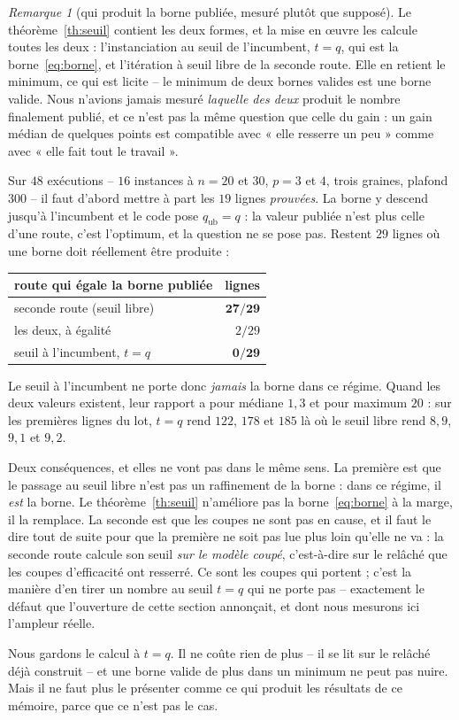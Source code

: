 \documentclass[11pt,a4paper]{article}
\theoremstyle{plain}
\theoremstyle{remark}
\newtheorem{remark}{Remarque}
\begin{document}
\begin{remark}[qui produit la borne publiée, mesuré plutôt que supposé]
\label{rem:routeporteuse}
Le théorème~\ref{th:seuil} contient les deux formes, et la mise en {\oe}uvre
les calcule toutes les deux : l'instanciation au seuil de l'incumbent,
$t=q$, qui est la borne~\eqref{eq:borne}, et l'itération à seuil libre de la
seconde route. Elle en retient le minimum, ce qui est licite -- le minimum
de deux bornes valides est une borne valide. Nous n'avions jamais mesuré
\emph{laquelle des deux} produit le nombre finalement publié, et ce n'est
pas la même question que celle du gain : un gain médian de quelques points
est compatible avec « elle resserre un peu » comme avec « elle fait tout le
travail ».

Sur $48$ exécutions -- $16$ instances à $n=20$ et $30$, $p=3$ et $4$, trois
graines, plafond $300$ -- il faut d'abord mettre à part les $19$ lignes
\emph{prouvées}. La borne y descend jusqu'à l'incumbent et le code pose
$q_{\text{ub}}=q$ : la valeur publiée n'est plus celle d'une route, c'est
l'optimum, et la question ne se pose pas. Restent $29$ lignes où une borne
doit réellement être produite :

\begin{center}\small
\begin{tabular}{lr}
\toprule
route qui égale la borne publiée & lignes\\
\midrule
seconde route (seuil libre) & $\mathbf{27/29}$\\
les deux, à égalité & $2/29$\\
seuil à l'incumbent, $t=q$ & $\mathbf{0/29}$\\
\bottomrule
\end{tabular}
\end{center}

\noindent
Le seuil à l'incumbent ne porte donc \emph{jamais} la borne dans ce régime.
Quand les deux valeurs existent, leur rapport a pour médiane $1{,}3$ et pour
maximum $20$ : sur les premières lignes du lot, $t=q$ rend $122$, $178$ et
$185$ là où le seuil libre rend $8{,}9$, $9{,}1$ et $9{,}2$.

Deux conséquences, et elles ne vont pas dans le même sens. La première est
que le passage au seuil libre n'est pas un raffinement de la borne : dans ce
régime, il \emph{est} la borne. Le théorème~\ref{th:seuil} n'améliore pas
la borne~\eqref{eq:borne} à la marge, il la remplace. La seconde est que les
coupes ne sont pas en cause, et il faut le dire tout de suite pour que la
première ne soit pas lue plus loin qu'elle ne va : la seconde route calcule
son seuil \emph{sur le modèle coupé}, c'est-à-dire sur le relâché que les
coupes d'efficacité ont resserré. Ce sont les coupes qui portent ; c'est la
manière d'en tirer un nombre au seuil $t=q$ qui ne porte pas -- exactement
le défaut que l'ouverture de cette section annonçait, et dont nous mesurons
ici l'ampleur réelle.

Nous gardons le calcul à $t=q$. Il ne coûte rien de plus -- il se lit sur le
relâché déjà construit -- et une borne valide de plus dans un minimum ne
peut pas nuire. Mais il ne faut plus le présenter comme ce qui produit les
résultats de ce mémoire, parce que ce n'est pas le cas.
\end{remark}
\end{document}
